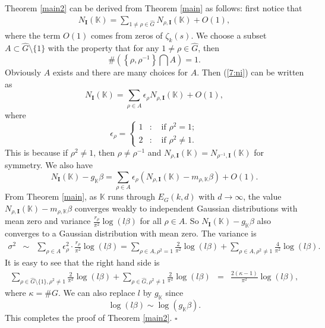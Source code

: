 \documentclass[12pt]{amsart}
\theoremstyle{plain}
\begin{document}
Theorem \ref{main2} can be derived from Theorem \ref{main} as follows: first notice that
\begin{eqnarray} \label{7:ni} N_{{\mathbf I}}({{\mathbb K}})=\sum_{1 \ne \rho \in \widehat{G}} N_{\rho,{{\mathbf I}}}({{\mathbb K}})+O(1),\end{eqnarray}
where the term $O(1)$ comes from zeros of $\zeta_k(s)$. We choose a subset $A \subset \widehat{G} \setminus \{1\}$ with the property that for any $1 \ne \rho \in \widehat{G}$, then
\[\#\left(\left\{\rho,\rho^{-1}\right\} \bigcap A \right)=1. \]
Obviously $A$ exists and there are many choices for $A$. Then (\ref{7:ni}) can be written as
\[N_{{\mathbf I}}({{\mathbb K}})=\sum_{\rho \in A} \epsilon_{\rho} N_{\rho,{{\mathbf I}}}({{\mathbb K}})+O(1),\]
where
\[ \epsilon_{\rho}=\left\{\begin{array}{lll}1&:& \mbox{ if } \rho^2=1;\\
2&:& \mbox{ if } \rho^2 \ne 1. \end{array}\right.\]
This is because if $\rho^2 \ne 1$, then $\rho \ne \rho^{-1}$ and $N_{\rho,{{\mathbf I}}}({{\mathbb K}})=N_{\rho^{-1},{{\mathbf I}}}({{\mathbb K}})$ for symmetry. We also have
\[N_{{\mathbf I}}({{\mathbb K}})-g_{{\mathbb K}} \beta=\sum_{\rho \in A} \epsilon_{\rho} \left(N_{\rho,{{\mathbf I}}}({{\mathbb K}})-m_{\rho,{{\mathbb K}}} \beta\right)+O(1). \]
From Theorem \ref{main}, as ${{\mathbb K}}$ runs through $E_G(k,d)$ with $d \to \infty$, the value $N_{\rho,{{\mathbf I}}}({{\mathbb K}})-m_{\rho,{{\mathbb K}}} \beta$ converges weakly to independent Gaussian distributions with mean zero and variance $\frac{r_{\rho}}{\pi^2} \log (l \beta)$ for all $\rho \in A$. So $N_{{\mathbf I}}({{\mathbb K}})-g_{{\mathbb K}} \beta$ also converges to a Gaussian distribution with mean zero. The variance is
\begin{eqnarray*} \sigma^2 &\sim & \sum_{\rho \in A} \epsilon_{\rho}^2 \cdot \frac{r_{\rho}}{\pi^2} \log (l \beta) =\sum_{\rho \in A, \rho^2=1} \frac{2}{\pi^2} \log (l \beta)+\sum_{\rho \in A, \rho^2 \ne 1} \frac{4}{\pi^2} \log (l \beta). \end{eqnarray*}
It is easy to see that the right hand side is
\begin{eqnarray*}
\sum_{\rho \in \widehat{G}\setminus \{1\}, \rho^2 \ne 1} \frac{2}{\pi^2} \log (l \beta) +\sum_{\rho \in \widehat{G}, \rho^2 \ne 1} \frac{2}{\pi^2} \log (l \beta)
&=& \frac{2(\kappa-1)}{\pi^2} \log (l \beta),
\end{eqnarray*}
where $\kappa=\#G$. We can also replace $l$ by $g_{{\mathbb K}}$ since
\[\log (l \beta) \sim \log (g_{{\mathbb K}} \beta). \]
This completes the proof of Theorem \ref{main2}. \quad $\square$
\end{document}
